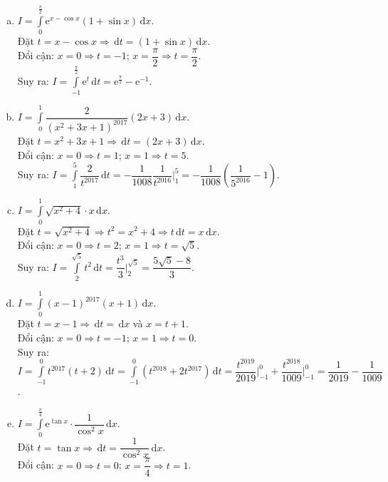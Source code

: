 \begin{ex}
{\begin{enumerate}[a)]
		\item $I=\displaystyle\int\limits_0^{\tfrac{\pi}{2}}\mathrm{e}^{x-\cos x}(1+\sin x)\mathrm{\,d}x$.\\
		Đặt $t=x-\cos x\Rightarrow\mathrm{\,d}t=(1+\sin x)\mathrm{\,d}x$.\\
		Đổi cận: $x=0\Rightarrow t=-1$; $x=\dfrac{\pi}{2}\Rightarrow t=\dfrac{\pi}{2}$.\\
		Suy ra: $I=\displaystyle\int\limits_{-1}^{\tfrac{\pi}{2}}\mathrm{e}^t\mathrm{\,d}t=\mathrm{e}^{\tfrac{\pi}{2}}-\mathrm{e}^{-1}$.
		\item $I=\displaystyle\int\limits_0^1\dfrac{2}{(x^2+3x+1)^{2017}}(2x+3)\mathrm{\,d}x$.\\
		Đặt $t=x^2+3x+1\Rightarrow\mathrm{\,d}t=(2x+3)\mathrm{\,d}x$.\\
		Đổi cận: $x=0\Rightarrow t=1$; $x=1\Rightarrow t=5$.\\
		Suy ra: $I=\displaystyle\int\limits_1^5\dfrac{2}{t^{2017}}\mathrm{\,d}t= -\dfrac{1}{1008}\dfrac{1}{t^{2016}}\bigg|_1^5=-\dfrac{1}{1008}\left(\dfrac{1}{5^{2016}}-1\right)$.
		\item $I=\displaystyle\int\limits_0^1\sqrt{x^2+4}\cdot x\mathrm{\,d}x$.\\
		Đặt $t=\sqrt{x^2+4}\Rightarrow t^2=x^2+4\Rightarrow t\mathrm{\,d}t=x\mathrm{\,d}x$.\\
		Đổi cận: $x=0\Rightarrow t=2$; $x=1\Rightarrow t=\sqrt{5}$.\\
		Suy ra: $I=\displaystyle\int\limits_2^{\sqrt{5}} t^2\mathrm{\,d}t=\dfrac{t^3}{3}\bigg|_2^{\sqrt{5}}=\dfrac{5\sqrt{5}-8}{3}$.
		\item $I=\displaystyle\int\limits_0^1(x-1)^{2017}(x+1)\mathrm{\,d}x$.\\
		Đặt $t=x-1\Rightarrow\mathrm{\,d}t=\mathrm{\,d}x$ và $x=t+1$.\\
		Đổi cận: $x=0\Rightarrow t=-1$; $x=1\Rightarrow t=0$.\\
		Suy ra: $I=\displaystyle\int\limits_{-1}^0 t^{2017}(t+2)\mathrm{\,d}t=\displaystyle\int\limits_{-1}^0\left(t^{2018}+2t^{2017}\right)\mathrm{\,d}t=\dfrac{t^{2019}}{2019}\bigg|_{-1}^0+\dfrac{t^{2018}}{1009}\bigg|_{-1}^0=\dfrac{1}{2019}-\dfrac{1}{1009}$.
		\item $I=\displaystyle\int\limits_0^{\tfrac{\pi}{4}}\mathrm{e}^{\tan x}\cdot\dfrac{1}{\cos^2x}\mathrm{\,d}x$.\\
		Đặt $t=\tan x\Rightarrow\mathrm{\,d}t=\dfrac{1}{\cos^2x}\mathrm{\,d}x$.\\
		Đổi cận: $x=0\Rightarrow t=0$; $x=\dfrac{\pi}{4}\Rightarrow t=1$.\\

\end{enumerate}}
\end{ex}
